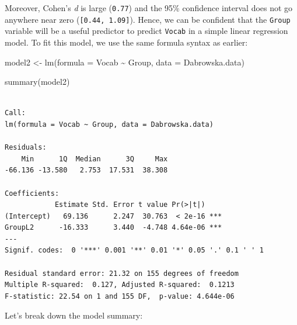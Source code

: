 \documentclass[
  letterpaper,
  DIV=11,
  numbers=noendperiod]{scrreprt}
\newenvironment{Shaded}{\begin{snugshade}}{\end{snugshade}}
\newcommand{\AttributeTok}[1]{\textcolor[rgb]{0.40,0.45,0.13}{#1}}
\newcommand{\FunctionTok}[1]{\textcolor[rgb]{0.28,0.35,0.67}{#1}}
\newcommand{\NormalTok}[1]{\textcolor[rgb]{0.00,0.23,0.31}{#1}}
\newcommand{\OtherTok}[1]{\textcolor[rgb]{0.00,0.23,0.31}{#1}}
\newcommand{\SpecialCharTok}[1]{\textcolor[rgb]{0.37,0.37,0.37}{#1}}
\begin{document}
Moreover, Cohen's \emph{d} is large (\texttt{0.77}) and the 95\%
confidence interval does not go anywhere near zero
(\texttt{{[}0.44,\ 1.09{]}}). Hence, we can be confident that the
\texttt{Group} variable will be a useful predictor to predict
\texttt{Vocab} in a simple linear regression model. To fit this model,
we use the same formula syntax as earlier:

\begin{Shaded}
\begin{Highlighting}[]
\NormalTok{model2 }\OtherTok{\textless{}{-}} \FunctionTok{lm}\NormalTok{(}\AttributeTok{formula =}\NormalTok{ Vocab }\SpecialCharTok{\textasciitilde{}}\NormalTok{ Group, }
             \AttributeTok{data =}\NormalTok{ Dabrowska.data)}

\FunctionTok{summary}\NormalTok{(model2)}
\end{Highlighting}
\end{Shaded}

\begin{verbatim}

Call:
lm(formula = Vocab ~ Group, data = Dabrowska.data)

Residuals:
    Min      1Q  Median      3Q     Max 
-66.136 -13.580   2.753  17.531  38.308 

Coefficients:
            Estimate Std. Error t value Pr(>|t|)    
(Intercept)   69.136      2.247  30.763  < 2e-16 ***
GroupL2      -16.333      3.440  -4.748 4.64e-06 ***
---
Signif. codes:  0 '***' 0.001 '**' 0.01 '*' 0.05 '.' 0.1 ' ' 1

Residual standard error: 21.32 on 155 degrees of freedom
Multiple R-squared:  0.127, Adjusted R-squared:  0.1213 
F-statistic: 22.54 on 1 and 155 DF,  p-value: 4.644e-06
\end{verbatim}

Let's break down the model summary:
\end{document}
